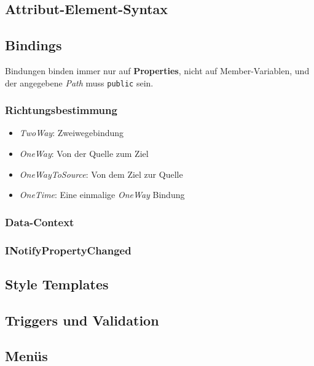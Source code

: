 \documentclass
[
	8pt,		%
	ngerman,	%
	a4paper,	%
	landscape,	%
	final		%
]{extarticle}
\begin{document}
\begin{multicols*}{3}
	\subsection{Attribut-Element-Syntax}
	
	
	\subsection{Bindings}
	Bindungen binden immer nur auf \textbf{Properties}, nicht auf
	Member-Variablen, und der angegebene \textit{Path} muss \texttt{public} sein.
	\subsubsection{Richtungsbestimmung}
	\begin{itemize}
		\item \textit{TwoWay}: Zweiwegebindung
		\item \textit{OneWay}: Von der Quelle zum Ziel
		\item \textit{OneWayToSource}: Von dem Ziel zur Quelle
		\item \textit{OneTime}: Eine einmalige \textit{OneWay} Bindung
	\end{itemize}
	\subsubsection{Data-Context}
	
	
	\subsubsection{INotifyPropertyChanged}
	
	\subsection{Style Templates}
	
	\subsection{Triggers und Validation}
	
	
	\subsection{Menüs}
	
\end{multicols*}
\end{document}
